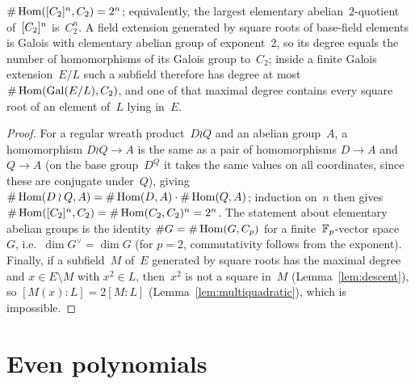 \begin{lemma}
  \label{lem:wreathab}
  \leanok
  $\#\operatorname{Hom}([C_2]^{n}, C_2) = 2^n$; equivalently, the largest elementary abelian~$2$-quotient
  of~$[C_2]^{n}$ is~$C_2^n$. A field extension generated by square roots of base-field elements is
  Galois with elementary abelian group of exponent~$2$, so its degree equals the number of
  homomorphisms of its Galois group to~$C_2$; inside a finite Galois extension~$E/L$ such a
  subfield therefore has degree at most $\#\operatorname{Hom}(\operatorname{Gal}(E/L), C_2)$, and one of that maximal degree
  contains every square root of an element of~$L$ lying in~$E$.
\end{lemma}
\begin{proof}
  \leanok
  For a regular wreath product~$D \wr Q$ and an abelian group~$A$, a homomorphism $D \wr Q \to A$
  is the same as a pair of homomorphisms $D \to A$ and $Q \to A$ (on the base group~$D^Q$ it
  takes the same values on all coordinates, since these are conjugate under~$Q$), giving
  $\#\operatorname{Hom}(D \wr Q, A) = \#\operatorname{Hom}(D, A) \cdot \#\operatorname{Hom}(Q, A)$; induction on~$n$ then gives
  $\#\operatorname{Hom}([C_2]^{n}, C_2) = \#\operatorname{Hom}(C_2, C_2)^n = 2^n$. The statement about elementary abelian
  groups is the identity $\#G = \#\operatorname{Hom}(G, C_p)$ for a finite~$\mathbb{F}_p$-vector space~$G$, i.e.\
  $\dim G^{\vee} = \dim G$ (for $p = 2$, commutativity follows from the exponent). Finally, if a
  subfield~$M$ of~$E$ generated by square roots has the maximal degree and $x \in E \setminus M$
  with $x^2 \in L$, then~$x^2$ is not a square in~$M$ (Lemma~\ref{lem:descent}), so
  $[M(x) : L] = 2[M : L]$ (Lemma~\ref{lem:multiquadratic}), which is impossible.
\end{proof}

\section{Even polynomials}

